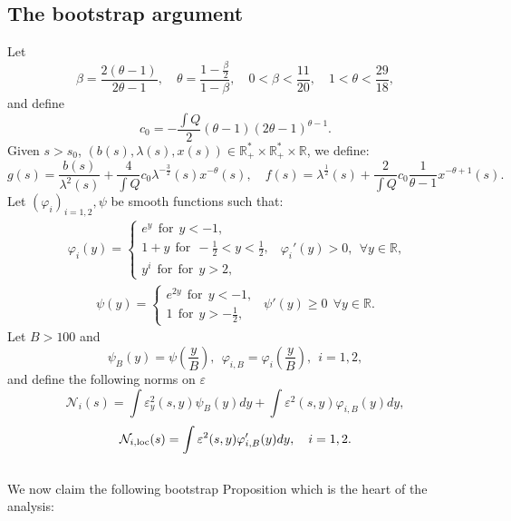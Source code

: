 \documentclass[11pt,a4paper,reqno]{amsart}
\theoremstyle{remark}
\numberwithin{equation}{section}
\newcommand{\be}{\begin{equation}}
\newcommand{\ee}{\end{equation}}
\newcommand{\bea}{\begin{eqnarray}}
\newcommand{\eea}{\end{eqnarray}}
\def\RR{\mathbb{R}}
\def\RR{\mathbb{R}}
\def\e{\varepsilon}
\def\l{\lambda}
\begin{document}
\subsection{The bootstrap argument}

Let $$
\beta =   \frac { 2(\theta-1)} {2\theta-1},\quad
\theta = \frac {1-\frac \beta2}{1-\beta}, \quad 0< \beta< \frac {11}{20}, \quad
1<\theta <\frac {29}{18},$$ and define
\be
\label{defcobeta}
c_0=-\frac {\int Q}2(\theta-1)(2\theta-1)^{\theta-1}.
\ee
Given $s>s_0$, $(b(s),\l(s),x(s))\in \RR^*_+\times \RR^*_+\times \RR$, we define:
 $$
g(s) =\frac {b(s)}{\l^2(s)} + \frac 4{\int Q} c_0   \l^{-\frac 32}(s) x^{-\theta}(s),\quad
f(s) =   \l^{\frac 12} (s) + \frac 2 {\int Q} c_0 \frac {1}{\theta-1} {x^{-\theta+1}(s)}.
$$
Let  $(\varphi_i)_{i=1,2},\psi$  be smooth functions such that:
\bea
\label{defphi1bis}
\varphi_i(y) =\left\{\begin{array}{lll}e^{y}\ \ \mbox{for} \ \   y<-1,\\
 1+y  \ \ \mbox{for}\ \ -\frac 12<y<\frac 12,\\ 
 y^i\ \ \mbox{for}\ \ \mbox{for}\ \ y>2,
 \end{array}\right.  \ \ \varphi_i'(y) >0, \ \ \forall y\in \RR,
\eea
\bea
\label{defphi2}
\psi(y) =\left\{\begin{array}{ll} e^{2y}\ \ \mbox{for}   \ \ y<-1,\\
 1  \ \ \mbox{for}\ \ y>-\tfrac 12,\end{array}\right.  \ \ \psi'(y) \geq 0 \ \ \forall y\in \RR.
\eea
Let $B> 100$ and
 $$\psi_B(y)=\psi\left(\frac yB\right), \ \ \varphi_{i,B}=\varphi_i\left(\frac yB\right), \ \ i=1,2,$$ 
 and define the following norms on $\e$
  \begin{equation}\label{eq:no}
{\mathcal{N}_i}  (s)  = \int  \varepsilon_y^2(s,y) \psi_{B}(y)dy + \int  \varepsilon^2(s,y) \varphi_{i,B}(y)   dy, 
\end{equation} 
\be\label{eq:noloc}
{\mathcal{N}_{i,\rm loc}} (s)  =    \int\varepsilon^2 (s,y)     \varphi'_{i,B} (y) dy,\quad i=1,2.
\ee
\\
We now claim the following bootstrap Proposition which is the heart of the analysis:
\end{document}

